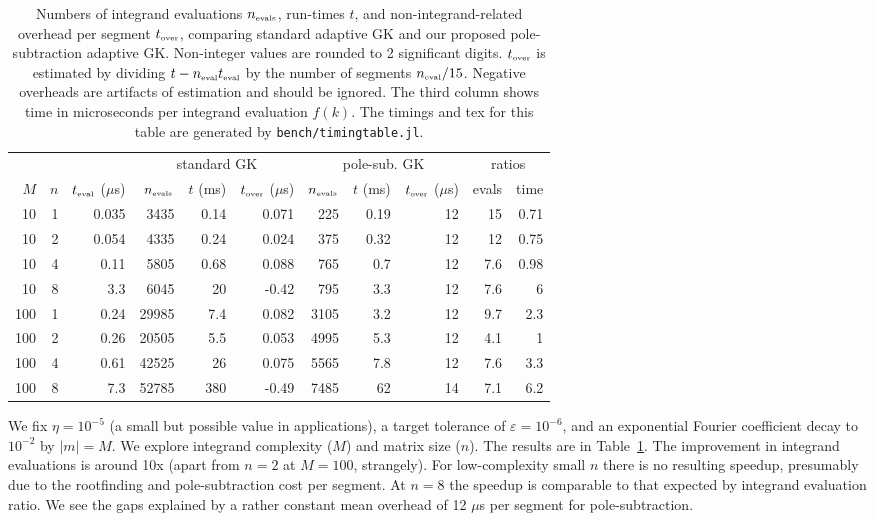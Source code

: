 \documentclass[11pt]{article}
\newcommand{\ca}[2]{\caption{#1 \label{#2}}}
\newcommand{\tbox}[1]{{\mbox{\tiny #1}}}
\newcommand{\eps}{\varepsilon}
\begin{document}
\begin{table}   %
  \centering
\begin{tabular}{r|r|r|rrr|rrr|rr|}
&&& \multicolumn{3}{c}{standard GK} & \multicolumn{3}{c}{pole-sub. GK} & \multicolumn{2}{c}{ratios}\\ 
$M$ & $n$ & $t_\tbox{eval}$ ($\mu$s) & $n_\tbox{evals}$ & $t$ (ms) & $t_\tbox{over}$ ($\mu$s) & $n_\tbox{evals}$ & $t$ (ms) & $t_\tbox{over}$ ($\mu$s) & evals & time\\ 
\hline
10 & 1 & 0.035 & 3435 & 0.14 & 0.071 & 225 & 0.19 & 12 & 15 & 0.71\\ 
10 & 2 & 0.054 & 4335 & 0.24 & 0.024 & 375 & 0.32 & 12 & 12 & 0.75\\ 
10 & 4 & 0.11 & 5805 & 0.68 & 0.088 & 765 & 0.7 & 12 & 7.6 & 0.98\\ 
10 & 8 & 3.3 & 6045 & 20 & -0.42 & 795 & 3.3 & 12 & 7.6 & 6\\ 
\hline
100 & 1 & 0.24 & 29985 & 7.4 & 0.082 & 3105 & 3.2 & 12 & 9.7 & 2.3\\ 
100 & 2 & 0.26 & 20505 & 5.5 & 0.053 & 4995 & 5.3 & 12 & 4.1 & 1\\ 
100 & 4 & 0.61 & 42525 & 26 & 0.075 & 5565 & 7.8 & 12 & 7.6 & 3.3\\ 
100 & 8 & 7.3 & 52785 & 380 & -0.49 & 7485 & 62 & 14 & 7.1 & 6.2\\ 
\hline
\end{tabular}
\ca{Numbers of integrand evaluations $n_\tbox{evals}$, run-times $t$,
  and non-integrand-related overhead per segment $t_\tbox{over}$, comparing
  standard adaptive GK and our proposed pole-subtraction adaptive GK.
  Non-integer values are rounded to 2 significant digits.
  $t_\tbox{over}$ is estimated by dividing $t - n_\tbox{eval}t_\tbox{eval}$ by
  the number of segments $n_\tbox{eval}/15$.
  Negative overheads are artifacts of estimation and should be ignored.
  The third column shows time in microseconds per integrand evaluation $f(k)$.
The timings and tex for this table are generated by {\tt bench/timingtable.jl}.
}{t:time}
\end{table}

We fix $\eta=10^{-5}$ (a small but possible value in applications),
a target tolerance of $\eps=10^{-6}$,
and an exponential Fourier coefficient decay to $10^{-2}$ by $|m|=M$.
We explore integrand complexity ($M$) and matrix size ($n$).
The results are in Table~\ref{t:time}.
The improvement in integrand evaluations is around 10x (apart from $n=2$ at $M=100$,
strangely).
For low-complexity small $n$ there is no resulting speedup, presumably
due to the rootfinding and pole-subtraction cost per segment.
At $n=8$ the speedup is comparable to that expected by integrand evaluation ratio.
We see the gaps explained by a rather constant mean overhead of 12 $\mu$s per segment
for pole-subtraction.
\end{document}
